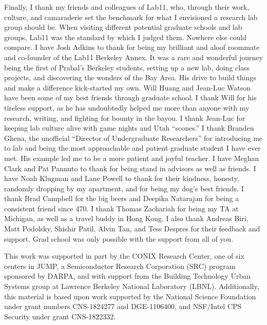 \begin{acknowledgements}
Finally, I thank my friends and colleagues of Lab11, who, through their work, culture, and camaraderie set the benchmark for what I envisioned a research lab group should be.
When visiting different potential graduate schools and lab groups, Lab11 was the standard by which I judged them. Nowhere else could compare.
I have Josh Adkins to thank for being my brilliant and aloof roommate and co-founder of the Lab11 Berkeley Annex.
It was a rare and wonderful journey being the first of Prabal's Berkeley students, setting up a new lab, doing class projects, and discovering the wonders of the Bay Area. His drive to build things and make a difference kick-started my own.
Will Huang and Jean-Luc Watson have been some of my best friends through graduate school.
I thank Will for his tireless support, as he has undoubtedly helped me more than anyone with my research, writing, and fighting for bounty in the bayou. 
I thank Jean-Luc for keeping lab culture alive with game nights and Utah ``scones.'' 
I thank Branden Ghena, the unofficial ``Director of Undergraduate Researchers'' for introducing me to lab and being the most approachable and patient graduate student I have ever met. 
His example led me to be a more patient and joyful teacher. 
I have Meghan Clark and Pat Pannuto to thank for being stand in advisors as well as friends.
I have Noah Klugman and Lane Powell to thank for their kindness, honesty, randomly dropping by my apartment, and for being my dog's best friends.
I thank Brad Campbell for the big beers and Deepika Natarajan for being a consistent friend since 470. 
I thank Thomas Zachariah for being my TA at Michigan, as well as a travel buddy in Hong Kong.
I also thank Andreas Biri, Matt Podolsky, Shishir Patil, Alvin Tan, and Tess Despres for their feedback and support.
Grad school was only possible with the support from all of you.




\vspace*{\fill}
\noindent\small{This work was supported in part by the CONIX Research Center,
one of six centers in JUMP, a Semiconductor Research Corporation
(SRC) program sponsored by DARPA, 
and with support from the
Building Technology Urban Systems group at Lawrence Berkeley
National Laboratory (LBNL). 
Additionally, this material is
based upon work supported by the National Science Foundation
under grant numbers CNS-1824277 and DGE-1106400, and NSF/Intel CPS Security under grant CNS-1822332.
}
\end{acknowledgements}